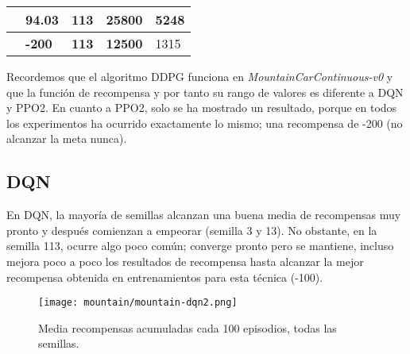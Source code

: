 \documentclass[11pt,fleqn]{book} %
\begin{document}
\begin{table}[H]
\begin{tabular}{c|l|l|l|l|}
		\rowcolor[HTML]{FFFFFF} 
		\multicolumn{1}{|c|}{\multirow{-3}{*}{\cellcolor[HTML]{C7DCB4}\textbf{DDPG}}}      & {\color[HTML]{000000} 94.03}                                                      & {\color[HTML]{000000} 113} & {\color[HTML]{000000} 25800}                                               & {\color[HTML]{000000} 5248} \\ \hline
		\rowcolor[HTML]{C3D7FA} 
		\multicolumn{1}{|c|}{\cellcolor[HTML]{C7DCB4}{\color[HTML]{000000} \textbf{PPO2}}} & \textbf{-200}                                                                     & \textbf{113}               & \textbf{12500}                                                             & 1315                        \\ \hline
	\end{tabular}
\end{table}

Recordemos que el algoritmo DDPG funciona en \textit{MountainCarContinuous-v0} y que la función de recompensa y por tanto su rango de valores es diferente a DQN y PPO2. En cuanto a PPO2, solo se ha mostrado un resultado, porque en todos los experimentos ha ocurrido exactamente lo mismo; una recompensa de -200 (no alcanzar la meta nunca).\\

\subsection{DQN}

En DQN, la mayoría de semillas alcanzan una buena media de recompensas muy pronto y después comienzan a empeorar (semilla 3 y 13). No obstante, en la semilla 113, ocurre algo poco común; converge pronto pero se mantiene, incluso mejora poco a poco los resultados de recompensa hasta alcanzar la mejor recompensa obtenida en entrenamientos para esta técnica (-100). \\


\begin{figure}[H]
	\centering\texttt{[image: mountain/mountain-dqn2.png]}
	\caption{Media recompensas acumuladas cada 100 episodios, todas las semillas.}
	\label{fig:mountainDQN2} %
\end{figure} 
\end{document}
